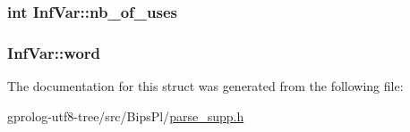 \subsubsection[{\texorpdfstring{nb\+\_\+of\+\_\+uses}{nb_of_uses}}]{\setlength{\rightskip}{0pt plus 5cm}int Inf\+Var\+::nb\+\_\+of\+\_\+uses}\hypertarget{structInfVar_a38f07afe6ae0ae7f591cf95796469f83}{}\label{structInfVar_a38f07afe6ae0ae7f591cf95796469f83}
\subsubsection[{\texorpdfstring{word}{word}}]{ Inf\+Var\+::word}\hypertarget{structInfVar_acc66e228f4cfbb1ab828b0bb95a69621}{}\label{structInfVar_acc66e228f4cfbb1ab828b0bb95a69621}


The documentation for this struct was generated from the following file\+:\begin{DoxyCompactItemize}
\item 
gprolog-\/utf8-\/tree/src/\+Bips\+Pl/\hyperlink{parse__supp_8h}{parse\+\_\+supp.\+h}\end{DoxyCompactItemize}
